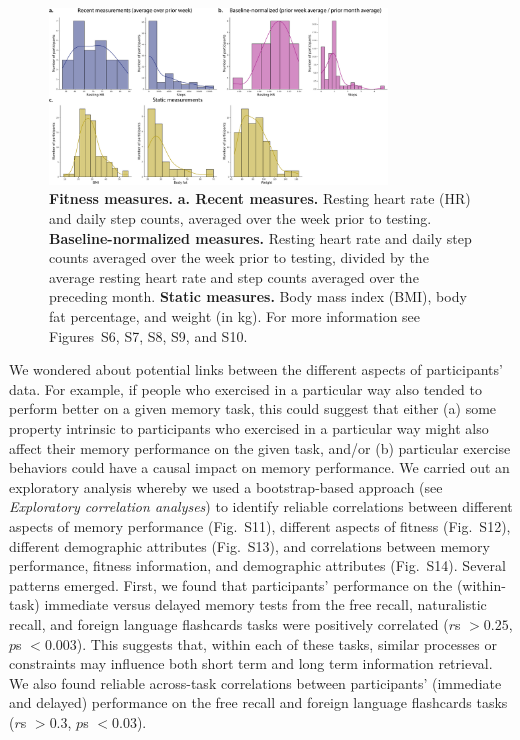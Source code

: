 \documentclass[10pt]{article}
\newcommand{\fitDists}{S6}
\newcommand{\fitDistgridImmediate}{S7}
\newcommand{\fitScatterImmediate}{S8}
\newcommand{\fitDistgridDelayed}{S9}
\newcommand{\fitScatterDelayed}{S10}
\newcommand{\behBehCorr}{S11}
\newcommand{\fitFitCorr}{S12}
\newcommand{\demDemCorr}{S13}
\newcommand{\allCorr}{S14}
\begin{document}
\begin{figure}[tp]
\centering
\includegraphics[width=0.8\textwidth]{figs/fitness_distributions_summary}
\caption{\textbf{Fitness measures.}  \textbf{a. Recent measures.}
  Resting heart rate (HR) and daily step counts, averaged over the
  week prior to testing.  \textbf{Baseline-normalized measures.}
  Resting heart rate and daily step counts averaged over the week
  prior to testing, divided by the average resting heart rate and step
counts averaged over the preceding month.  \textbf{Static measures.}
Body mass index (BMI), body fat percentage, and weight (in kg).  For
more information see Figures~\fitDists, \fitDistgridImmediate,
\fitScatterImmediate, \fitDistgridDelayed, and \fitScatterDelayed.}
\label{fig:fitness_summary}
\end{figure}

We wondered about potential links between the different aspects of
participants' data.  For example, if people who exercised in a
particular way also tended to perform better on a given memory task,
this could suggest that either (a) some property intrinsic to participants who
exercised in a particular way might also affect their memory
performance on the given task, and/or (b) particular exercise behaviors
could have a causal impact on memory performance.  We carried out an
exploratory analysis whereby we used a bootstrap-based approach (see
\textit{Exploratory correlation analyses}) to
identify reliable correlations between different aspects of memory
performance (Fig.~\behBehCorr), different aspects of fitness (Fig.~\fitFitCorr), different demographic
attributes (Fig.~\demDemCorr), and correlations between memory
performance, fitness information, and demographic attributes
(Fig.~\allCorr).  Several patterns emerged.  First, we found that
participants' performance on the (within-task) immediate versus delayed memory tests
from the free recall, naturalistic recall, and foreign language
flashcards tasks were positively correlated ($r$s $> 0.25$, $p$s $< 0.003$).  This suggests that, within each of these tasks,
similar processes or constraints may influence both short term and
long term information retrieval.  We also found reliable across-task correlations
between participants' (immediate and delayed) performance on the free
recall and foreign language flashcards tasks ($r$s $> 0.3$, $p$s $< 0.03$).
\end{document}
